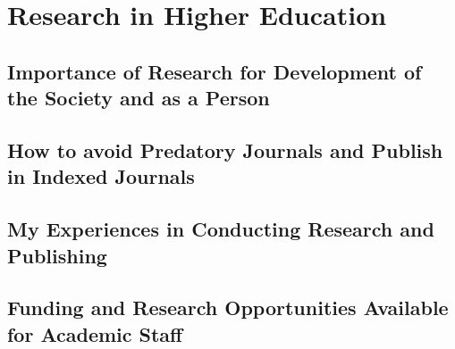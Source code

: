 \chapter{Research in Higher Education}
\section{Importance of Research for Development of the Society and as a Person}
\section{How to avoid Predatory Journals and Publish in Indexed Journals}
\section{My Experiences in Conducting Research and Publishing}
\section{Funding and Research Opportunities Available for Academic Staff}
